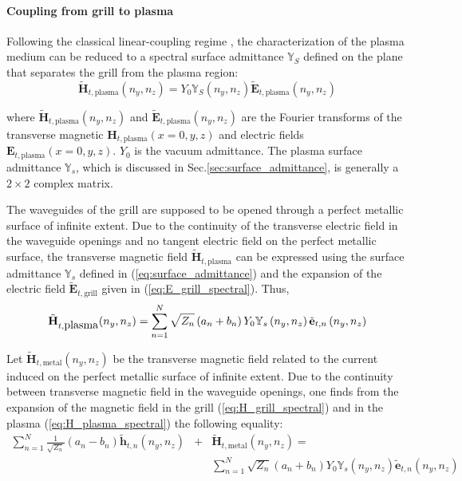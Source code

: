 \paragraph{Coupling from grill to plasma}

Following the classical linear-coupling regime \cite{brambilla1979,bers1983}, the characterization of the plasma medium can be reduced to a spectral surface admittance $\mathbb{Y}_{S}$ defined on the plane that separates the grill from the plasma region:
\begin{equation}
\tilde{\mathbf{H}}_{t,\mbox{plasma}}\left(n_{y},n_{z}\right)=Y_{0}\mathbb{Y}_{S}\left(n_{y},n_{z}\right)\tilde{\mathbf{E}}_{t,\mbox{plasma}}\left(n_{y},n_{z}\right)\label{eq:surface_admittance}
\end{equation}

where $\tilde{\mathbf{H}}_{t,\mbox{plasma}}\left(n_{y},n_{z}\right)$ and $\tilde{\mathbf{E}}_{t,\mbox{plasma}}\left(n_{y},n_{z}\right)$ are the Fourier transforms of the transverse magnetic $\mathbf{H}_{t,\mbox{plasma}}(x=0,y,z)$ and electric fields $\mathbf{E}_{t,\mbox{plasma}}(x=0,y,z)$. $Y_{0}$ is the vacuum admittance. The plasma surface admittance $\mathbb{Y}_{s}$, which is discussed in Sec.\ref{sec:surface_admittance}, is generally
a $2\times2$ complex matrix.

The waveguides of the grill are supposed to be opened through a perfect metallic surface of infinite extent. Due to the continuity of the transverse electric field in the waveguide openings and no tangent electric field on the perfect metallic surface, the transverse magnetic field $\tilde{\mathbf{H}}_{t,\mbox{plasma}}$ can be expressed using the surface admittance $\mathbb{Y}_{s}$ defined in (\ref{eq:surface_admittance}) and the expansion of the electric field $\tilde{\mathbf{E}}_{t,\mbox{grill}}$ given in (\ref{eq:E_grill_spectral}). Thus, 
\begin{equation}
\tilde{\mathbf{H}}_{t,\mbox{plasma}}\mbox{\ensuremath{\left(n_{y},n_{z}\right)}}=\sum_{n=1}^{N}\sqrt{Z_{n}}\left(a_{n}+b_{n}\right)Y_{0}\mathbb{Y}_{s}\left(n_{y},n_{z}\right)\tilde{\mathbf{e}}_{t,n}\left(n_{y},n_{z}\right)\label{eq:H_plasma_spectral}
\end{equation}

Let $\tilde{\mathbf{H}}_{t,\mbox{metal}}\left(n_{y},n_{z}\right)$ be the transverse magnetic field related to the current induced on the perfect metallic surface of infinite extent. Due to the continuity between transverse magnetic field in the waveguide openings, one finds from the expansion of the magnetic field in the grill (\ref{eq:H_grill_spectral}) and in the plasma (\ref{eq:H_plasma_spectral}) the following equality:
\begin{eqnarray}
\sum_{n=1}^{N}\frac{1}{\sqrt{Z_{n}}}\left(a_{n} - b_{n}\right)\tilde{\mathbf{h}}_{t,n}\left(n_{y},n_{z}\right) & + & \tilde{\mathbf{H}}_{t,\mbox{metal}}\left(n_{y},n_{z}\right)=\label{eq:H_continuity_spectral}\\
&  & \sum_{n=1}^{N}\sqrt{Z_{n}}\left(a_{n}+b_{n}\right)Y_{0}\mathbb{Y}_{s}\left(n_{y},n_{z}\right)\tilde{\mathbf{e}}_{t,n}\left(n_{y},n_{z}\right)\nonumber 
\end{eqnarray}


